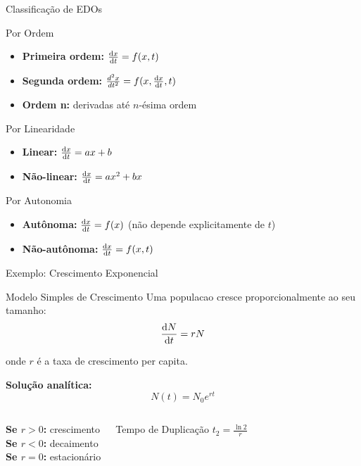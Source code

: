 \begin{frame}[shrink]{Classificação de EDOs}
\begin{block}{Por Ordem}
\begin{itemize}
    \item \textbf{Primeira ordem:} $\frac{\mathrm{d} x}{\mathrm{d} t} = f(x,t)$
    \item \textbf{Segunda ordem:} $\frac{d^2x}{dt^2} = f(x, \frac{\mathrm{d} x}{\mathrm{d} t}, t)$
    \item \textbf{Ordem n:} derivadas até $n$-ésima ordem
\end{itemize}
\end{block}

\begin{block}{Por Linearidade}
\begin{itemize}
    \item \textbf{Linear:} $\frac{\mathrm{d} x}{\mathrm{d} t} = ax + b$
    \item \textbf{Não-linear:} $\frac{\mathrm{d} x}{\mathrm{d} t} = ax^2 + bx$
\end{itemize}
\end{block}

\begin{block}{Por Autonomia}
\begin{itemize}
    \item \textbf{Autônoma:} $\frac{\mathrm{d} x}{\mathrm{d} t} = f(x)$ (não depende explicitamente de $t$)
    \item \textbf{Não-autônoma:} $\frac{\mathrm{d} x}{\mathrm{d} t} = f(x,t)$
\end{itemize}
\end{block}
\end{frame}

\begin{frame}[shrink=10]{Exemplo: Crescimento Exponencial}
\begin{block}{Modelo Simples de Crescimento}
Uma populacao cresce proporcionalmente ao seu tamanho:
\begin{equation*}
\frac{\mathrm{d} N}{\mathrm{d} t} = rN
\end{equation*}

onde $r$ é a taxa de crescimento per capita.
\end{block}

\textbf{Solução analítica:}
\begin{equation*}
N(t) = N_0 e^{rt}
\end{equation*}

\begin{columns}
\textbf{Se $r > 0$:} crescimento\\
\textbf{Se $r < 0$:} decaimento\\
\textbf{Se $r = 0$:} estacionário

\begin{exampleblock}{Tempo de Duplicação}
$t_{2} = \frac{\ln 2}{r}$
\end{exampleblock}
\end{columns}
\end{frame}


